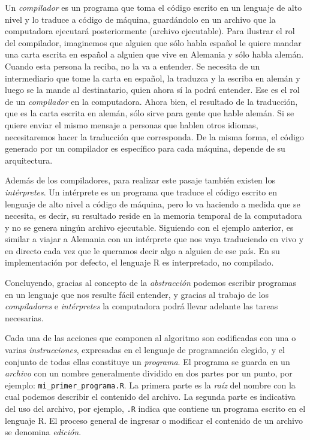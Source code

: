 \documentclass[
]{book}
\begin{document}
Un \emph{compilador} es un programa que toma el código escrito en un lenguaje de alto nivel y lo traduce a código de máquina, guardándolo en un archivo que la computadora ejecutará posteriormente (archivo ejecutable). Para ilustrar el rol del compilador, imaginemos que alguien que sólo habla español le quiere mandar una carta escrita en español a alguien que vive en Alemania y sólo habla alemán. Cuando esta persona la reciba, no la va a entender. Se necesita de un intermediario que tome la carta en español, la traduzca y la escriba en alemán y luego se la mande al destinatario, quien ahora sí la podrá entender. Ese es el rol de un \emph{compilador} en la computadora. Ahora bien, el resultado de la traducción, que es la carta escrita en alemán, sólo sirve para gente que hable alemán. Si se quiere enviar el mismo mensaje a personas que hablen otros idiomas, necesitaremos hacer la traducción que corresponda. De la misma forma, el código generado por un compilador es específico para cada máquina, depende de su arquitectura.

Además de los compiladores, para realizar este pasaje también existen los \emph{intérpretes}. Un intérprete es un programa que traduce el código escrito en lenguaje de alto nivel a código de máquina, pero lo va haciendo a medida que se necesita, es decir, su resultado reside en la memoria temporal de la computadora y no se genera ningún archivo ejecutable. Siguiendo con el ejemplo anterior, es similar a viajar a Alemania con un intérprete que nos vaya traduciendo en vivo y en directo cada vez que le queramos decir algo a alguien de ese país. En su implementación por defecto, el lenguaje R es interpretado, no compilado.

Concluyendo, gracias al concepto de la \emph{abstracción} podemos escribir programas en un lenguaje que nos resulte fácil entender, y gracias al trabajo de los \emph{compiladores} e \emph{intérpretes} la computadora podrá llevar adelante las tareas necesarias.

Cada una de las acciones que componen al algoritmo son codificadas con una o varias \emph{instrucciones}, expresadas en el lenguaje de programación elegido, y el conjunto de todas ellas constituye un \emph{programa}. El programa se guarda en un \emph{archivo} con un nombre generalmente dividido en dos partes por un punto, por ejemplo: \texttt{mi\_primer\_programa.R}. La primera parte es la \emph{raíz} del nombre con la cual podemos describir el contenido del archivo. La segunda parte es indicativa del uso del archivo, por ejemplo, \texttt{.R} indica que contiene un programa escrito en el lenguaje R. El proceso general de ingresar o modificar el contenido de un archivo se denomina \emph{edición}.
\end{document}
